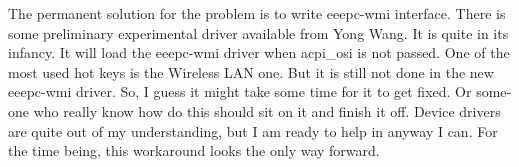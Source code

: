 \begin{english}
The permanent solution for the problem is to write eeepc-wmi interface. There is some preliminary 
experimental driver available from Yong Wang. It is quite in its infancy. It will load the eeepc-wmi 
driver when acpi\_osi is not passed. One of the most used hot keys is the Wireless LAN one. 
But it is still not done in the new eeepc-wmi driver. So, I guess it might take some time 
for it to get fixed. Or someone who really know how do this should sit on it and finish it off. 
Device drivers are quite out of my understanding, but I am ready to help in anyway I can. 
For the time being, this workaround looks the only way forward.
\end{english}
\newpage 
